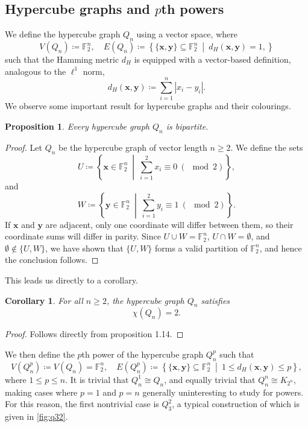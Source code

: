 \documentclass[12pt]{amsart}
\numberwithin{figure}{section}
\theoremstyle{plain}
\newtheorem{proposition}[theorem]{Proposition}
\newtheorem{corollary}[theorem]{Corollary}
\begin{document}
\subsection{Hypercube graphs and $p$th powers}
\indent We define the hypercube graph $Q_{n}$ using a vector space, where 
\[V(Q_{n}) \coloneqq\mathbb{F}_{2}^{n},\quad E(Q_{n}) \coloneqq\left\{\{\mathbf{x},\mathbf{y}\}\subseteq\mathbb{F}_{2}^{n}\:\middle|\:d_{H}(\mathbf{x},\mathbf{y}) = 1,\right\}\]
such that the Hamming metric $d_{H}$ is equipped with a vector-based definition, analogous to the $\ell^{1}$ norm, 
\[d_{H}(\mathbf{x},\mathbf{y})\coloneq\sum_{i=1}^{n}|x_{i} - y_{i}|.\]
\indent We observe some important result for hypercube graphs and their colourings.
\begin{proposition}
    Every hypercube graph $Q_{n}$ is bipartite.
\end{proposition}
\begin{proof}
    Let $Q_{n}$ be the hypercube graph of vector length $n\geq 2$. We define the sets 
    \[U \coloneq \left\{\mathbf{x}\in\mathbb{F}_{2}^{n}\:\middle|\:\textstyle\sum_{i=1}^{2}x_{i} \equiv 0 \:(\!\!\!\!\!\!\mod 2)\right\},\]
    and
    \[W\coloneq\left\{\mathbf{y}\in\mathbb{F}_{2}^{n}\:\middle|\:\textstyle\sum_{i=1}^{2}y_{i} \equiv 1 \:(\!\!\!\!\!\!\mod 2)\right\}.\]
    If $\mathbf{x}$ and $\mathbf{y}$ are adjacent, only one coordinate will differ between them, so their coordinate sums will differ in parity. Since $U\cup W = \mathbb{F}_{2}^{n}$, $U\cap W = \emptyset$, and $\emptyset \notin \{U, W\}$, we have shown that $\{U, W\}$ forms a valid partition of $\mathbb{F}_{2}^{n}$, and hence the conclusion follows.
\end{proof}
\indent This leads us directly to a corollary.
\begin{corollary}
    For all $n\geq 2$, the hypercube graph $Q_{n}$ satisfies
    \[\chi(Q_{n}) = 2.\]
\end{corollary}
\begin{proof}
    Follows directly from  proposition 1.14.
\end{proof}
\indent We then define the $p$th power of the hypercube graph $Q_{n}^{p}$ such that
\[V(Q_{n}^{p}) \coloneq V(Q_{n}) = \mathbb{F}_{2}^{n},\quad E(Q_{n}^{p}) \coloneq\left\{\{\mathbf{x}, \mathbf{y}\}\subseteq\mathbb{F}_{2}^{n}\:\middle|\:1\leq d_{H}(\mathbf{x}, \mathbf{y}) \leq p\right\},\]
where $1\leq p\leq n$. It is trivial that $Q_{n}^{1} \cong Q_{n}$, and equally trivial that $Q_{n}^{n} \cong K_{2^{n}}$, making cases where $p=1$ and $p=n$ generally uninteresting to study for powers. For this reason, the first nontrivial case is $Q_{3}^{2}$, a typical construction of which is given in \ref{fig:q32}.
\end{document}
